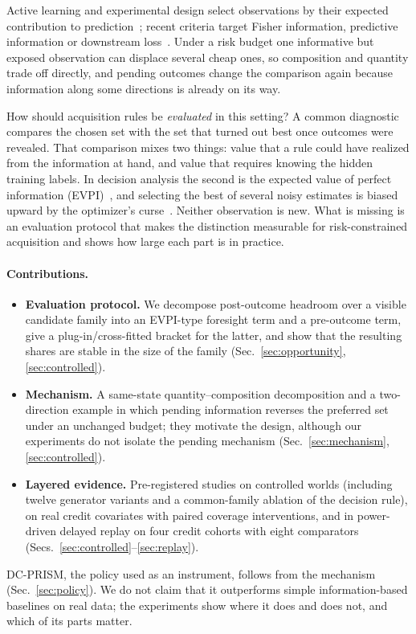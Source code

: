 \documentclass[runningheads]{llncs}
\begin{document}
Active learning and experimental design select observations by their expected contribution to prediction~\cite{cohn1996active,chaloner1995bayesian,settles2009active}; recent criteria target Fisher information, predictive information or downstream loss~\cite{ash2021fishing,bickfordsmith2023prediction,huang2026loss}. Under a risk budget one informative but exposed observation can displace several cheap ones, so composition and quantity trade off directly, and pending outcomes change the comparison again because information along some directions is already on its way.

How should acquisition rules be \emph{evaluated} in this setting? A common diagnostic compares the chosen set with the set that turned out best once outcomes were revealed. That comparison mixes two things: value that a rule could have realized from the information at hand, and value that requires knowing the hidden training labels. In decision analysis the second is the expected value of perfect information (EVPI)~\cite{howard1966information,raiffa1961applied}, and selecting the best of several noisy estimates is biased upward by the optimizer's curse~\cite{smith2006optimizer}. Neither observation is new. What is missing is an evaluation protocol that makes the distinction measurable for risk-constrained acquisition and shows how large each part is in practice.

\paragraph{Contributions.}
\begin{itemize}
\item \textbf{Evaluation protocol.} We decompose post-outcome headroom over a visible candidate family into an EVPI-type foresight term and a pre-outcome term, give a plug-in/cross-fitted bracket for the latter, and show that the resulting shares are stable in the size of the family (Sec.~\ref{sec:opportunity}, \ref{sec:controlled}).
\item \textbf{Mechanism.} A same-state quantity--composition decomposition and a two-direction example in which pending information reverses the preferred set under an unchanged budget; they motivate the design, although our experiments do not isolate the pending mechanism (Sec.~\ref{sec:mechanism}, \ref{sec:controlled}).
\item \textbf{Layered evidence.} Pre-registered studies on controlled worlds (including twelve generator variants and a common-family ablation of the decision rule), on real credit covariates with paired coverage interventions, and in power-driven delayed replay on four credit cohorts with eight comparators (Secs.~\ref{sec:controlled}--\ref{sec:replay}).
\end{itemize}
DC-PRISM, the policy used as an instrument, follows from the mechanism (Sec.~\ref{sec:policy}). We do not claim that it outperforms simple information-based baselines on real data; the experiments show where it does and does not, and which of its parts matter.
\end{document}
